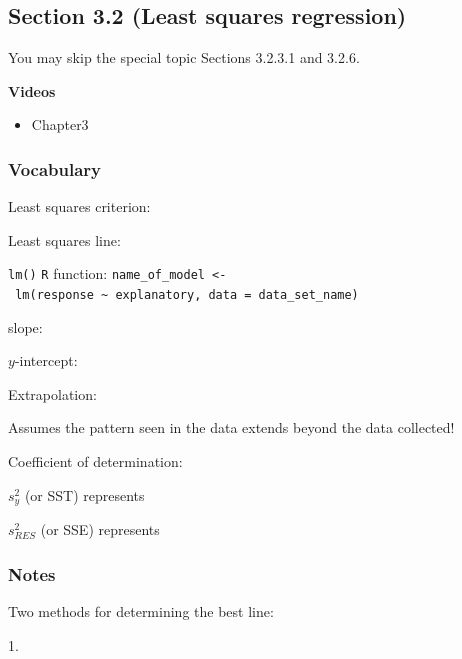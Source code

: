 \documentclass[
]{report}
\providecommand{\tightlist}{%
  \setlength{\itemsep}{0pt}\setlength{\parskip}{0pt}}
\newcommand{\rgs}{\vspace{12pt}} %
\newcommand{\rgi}{\hspace{24pt}}  %
\begin{document}
\hypertarget{section-3.2-least-squares-regression}{%
\subsection*{Section 3.2 (Least squares regression)}\label{section-3.2-least-squares-regression}}


You may skip the special topic Sections 3.2.3.1 and 3.2.6.

\textbf{Videos}

\begin{itemize}
\tightlist
\item
  Chapter3
\end{itemize}


\hypertarget{vocabulary-7}{%
\subsubsection*{Vocabulary}\label{vocabulary-7}}

Least squares criterion:
\rgs

Least squares line:
\rgs

\texttt{lm()} \texttt{R} function:
\rgi \texttt{name\_of\_model\ \textless{}-\ lm(response\ \textasciitilde{}\ explanatory,\ data\ =\ data\_set\_name)}

\rgs

slope:
\rgs

\(y\)-intercept:\\
\rgs

Extrapolation:

\rgi Assumes the pattern seen in the data extends beyond the data collected!

Coefficient of determination:

\rgi \(s_y^2\) (or SST) represents
\rgs

\rgi \(s_{RES}^2\) (or SSE) represents
\rgs

\hypertarget{notes-9}{%
\subsubsection*{Notes}\label{notes-9}}

Two methods for determining the best line:

\rgi 1.
\rgs
\end{document}
